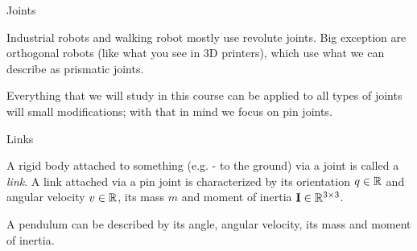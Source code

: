 \documentclass{beamer}
\begin{document}
\begin{frame}{Joints}
	\begin{flushleft}
		
		Industrial robots and walking robot mostly use revolute joints.	Big exception are orthogonal robots (like what you see in 3D printers), which use what we can describe as prismatic joints.
		
		\bigskip
		
		Everything that we will study in this course can be applied to all types of joints will small modifications; with that in mind we focus on pin joints.	
		
	\end{flushleft}
\end{frame}




\begin{frame}{Links}
	\begin{flushleft}
		
		
		A rigid body attached to something (e.g. - to the ground) via a joint is called a \emph{link}. A link attached via a pin joint is characterized by its orientation $q \in \mathbb{R}$ and angular velocity $v \in \mathbb{R}$, its mass $m$ and moment of inertia $\mathbf{I} \in \mathbb{R}^{3 \times 3}$.
		
		\bigskip
		
		\begin{example}
			A pendulum can be described by its angle, angular velocity, its mass and moment of inertia.
		\end{example}
		
	\end{flushleft}
\end{frame}
\end{document}
